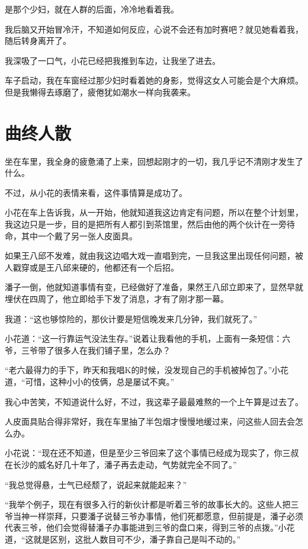是那个少妇，就在人群的后面，冷冷地看着我。

我后脑又开始冒冷汗，不知道如何反应，心说不会还有加时赛吧？就见她看着我，随后转身离开了。

我深吸了一口气，小花已经把我推到车边，让我坐了进去。

车子启动，我在车窗经过那少妇时看着她的身影，觉得这女人可能会是个大麻烦。但是我懒得去琢磨了，疲倦犹如潮水一样向我袭来。

\chapter{曲终人散}

坐在车里，我全身的疲惫涌了上来，回想起刚才的一切，我几乎记不清刚才发生了什么。

不过，从小花的表情来看，这件事情算是成功了。

小花在车上告诉我，从一开始，他就知道我这边肯定有问题，所以在整个计划里，我这边只是一步，目的是把所有人都引到茶馆里，然后由他的两个伙计在一旁待命，其中一个戴了另一张人皮面具。

如果王八邱不发难，就由我这边唱大戏一直唱到完，一旦我这里出现任何问题，被人戳穿或是王八邱来硬的，他都还有一个后招。

潘子一倒，他就知道事情有变，已经做好了准备，果然王八邱立即来了，显然早就埋伏在四周了，他立即给手下发了消息，才有了刚才那一幕。

我道：“这也够惊险的，那伙计要是短信晚发来几分钟，我们就死了。”

小花道：“这一行靠运气没法生存。”说着让我看他的手机，上面有一条短信：六爷，三爷带了很多人在我们铺子里，怎么办？

“老六最得力的手下，昨天和我唱K的时候，没发现自己的手机被掉包了。”小花道，“可惜，这种小小的伎俩，总是屡试不爽。”

我心中苦笑，不知道说什么好，不过，我这辈子最最难熬的一个上午算是过去了。

人皮面具贴合得非常好，我在车里抽了半包烟才慢慢地缓过来，问这些人回去会怎么办。

小花说：“现在还不知道，但是至少三爷回来了这个事情已经成为现实了，你三叔在长沙的威名好几十年了，潘子再去走动，气势就完全不同了。”

“我总觉得悬，士气已经颓了，说起来就能起来？”

“我举个例子，现在有很多入行的新伙计都是听着三爷的故事长大的。这些人把三爷当神一样崇拜，只要潘子说替三爷办事情，他们死都愿意，但前提是，潘子必须代表三爷，他们会觉得替潘子办事能进到三爷的盘口来，得到三爷的点拨。”小花道，“这就是区别，这批人数目可不少，潘子靠自己是叫不动的。”

